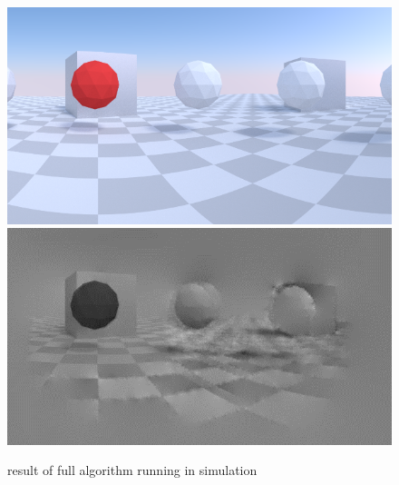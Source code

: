 \begin{figure}
\includegraphics[width=\columnwidth]{images/zigzag_input.png}
\includegraphics[width=\columnwidth]{images/zigzag_reconstruction.png}
\caption{result of full algorithm running in simulation}
\label{fig:zigzag_reconstruction}
\end{figure}
